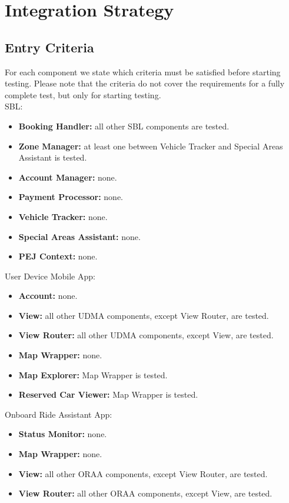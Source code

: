 \section{Integration Strategy}

\subsection{Entry Criteria}
For each component we state which criteria must be satisfied before starting testing. Please note that the criteria do not cover the requirements for a fully complete test, but only for starting testing.\\
SBL:
\begin{itemize}
    \item \textbf{Booking Handler:} all other SBL components are tested.
    \item \textbf{Zone Manager:} at least one between Vehicle Tracker and Special Areas Assistant is tested.
    \item \textbf{Account Manager:} none.
    \item \textbf{Payment Processor:} none.
    \item \textbf{Vehicle Tracker:} none.
    \item \textbf{Special Areas Assistant:} none.
    \item \textbf{PEJ Context:} none.
\end{itemize}
User Device Mobile App:
\begin{itemize}
    \item \textbf{Account:} none.
    \item \textbf{View:} all other UDMA components, except View Router, are tested.
    \item \textbf{View Router:} all other UDMA components, except View, are tested.
    \item \textbf{Map Wrapper:} none.
    \item \textbf{Map Explorer:} Map Wrapper is tested.
    \item \textbf{Reserved Car Viewer:} Map Wrapper is tested.
\end{itemize}
Onboard Ride Assistant App:
\begin{itemize}
    \item \textbf{Status Monitor:} none.
    \item \textbf{Map Wrapper:} none.
    \item \textbf{View:} all other ORAA components, except View Router, are tested.
    \item \textbf{View Router:} all other ORAA components, except View, are tested.
\end{itemize}

